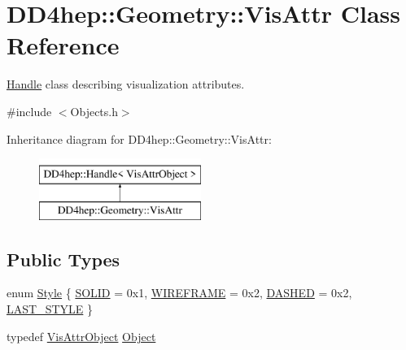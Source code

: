 \hypertarget{class_d_d4hep_1_1_geometry_1_1_vis_attr}{}\section{D\+D4hep\+:\+:Geometry\+:\+:Vis\+Attr Class Reference}
\label{class_d_d4hep_1_1_geometry_1_1_vis_attr}


\hyperlink{class_d_d4hep_1_1_handle}{Handle} class describing visualization attributes.  




{\ttfamily \#include $<$Objects.\+h$>$}

Inheritance diagram for D\+D4hep\+:\+:Geometry\+:\+:Vis\+Attr\+:\begin{figure}[H]
\begin{center}
\leavevmode
\includegraphics[height=2.000000cm]{class_d_d4hep_1_1_geometry_1_1_vis_attr}
\end{center}
\end{figure}
\subsection*{Public Types}
\begin{DoxyCompactItemize}
\item 
enum \hyperlink{class_d_d4hep_1_1_geometry_1_1_vis_attr_a6b393ca7e14c69cf689ce7274f8a7630}{Style} \{ \hyperlink{class_d_d4hep_1_1_geometry_1_1_vis_attr_a6b393ca7e14c69cf689ce7274f8a7630abb85e6313ec27720fcbae236740dd4c9}{S\+O\+L\+ID} = 0x1, 
\hyperlink{class_d_d4hep_1_1_geometry_1_1_vis_attr_a6b393ca7e14c69cf689ce7274f8a7630a0d68594c8595d3e08905204dc4262e4e}{W\+I\+R\+E\+F\+R\+A\+ME} = 0x2, 
\hyperlink{class_d_d4hep_1_1_geometry_1_1_vis_attr_a6b393ca7e14c69cf689ce7274f8a7630af20eddb2bef47dfd54509f51e7d8459a}{D\+A\+S\+H\+ED} = 0x2, 
\hyperlink{class_d_d4hep_1_1_geometry_1_1_vis_attr_a6b393ca7e14c69cf689ce7274f8a7630ac717929c78b2fc60a604e7dd0a09c419}{L\+A\+S\+T\+\_\+\+S\+T\+Y\+LE}
 \}
\item 
typedef \hyperlink{class_d_d4hep_1_1_geometry_1_1_vis_attr_object}{Vis\+Attr\+Object} \hyperlink{class_d_d4hep_1_1_geometry_1_1_vis_attr_a8c2a1708a4161f27aed36d464be316cc}{Object}
\end{DoxyCompactItemize}

